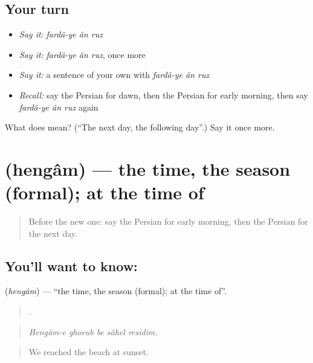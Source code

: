 \subsection*{Your turn}
\begin{itemize}
\raggedright
  \item \emph{Say it:} \emph{fardâ-ye ân ruz}
  \item \emph{Say it:} \emph{fardâ-ye ân ruz}, once more
  \item \emph{Say it:} a sentence of your own with \emph{fardâ-ye ân ruz}
  \item \emph{Recall:} say the Persian for dawn, then the Persian for early morning, then say \emph{fardâ-ye ân ruz} again
\end{itemize}

\begin{tcolorbox}[breakable,colback=teal!4,colframe=teal!35!black,title={Before you move on}]
What does    mean? (\textquotedblleft{}The next day, the following day\textquotedblright{}.) Say it once more.
\end{tcolorbox}
\section[\texorpdfstring{\fa{هنگام} (hengâm)}{هنگام (hengâm)}]{ (hengâm) — the time, the season (formal); at the time of}

\label{lesson:FA-C305-hengam}



\begin{quote}
Before the new one: say the Persian for early morning, then the Persian for the next day.
\end{quote}

\subsection*{You'll want to know: }
\textbf{} (\emph{hengâm}) — \textquotedblleft{}the time, the season (formal); at the time of\textquotedblright{}.

\begin{quote}
    .
\end{quote}

\begin{quote}
\emph{Hengâm-e ghorub be sâhel residim.}
\end{quote}

\begin{quote}
We reached the beach at sunset.
\end{quote}


